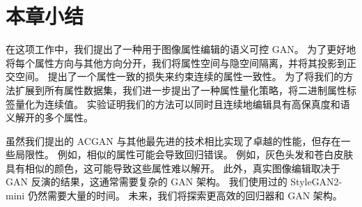 \section{本章小结}
在这项工作中，我们提出了一种用于图像属性编辑的语义可控 GAN。 为了更好地将每个属性方向与其他方向分开，我们将属性空间与隐空间隔离，并将其投影到正交空间。 提出了一个属性一致的损失来约束连续的属性一致性。 为了将我们的方法扩展到所有属性数据集，我们进一步提出了一种属性量化策略，将二进制属性标签量化为连续值。 实验证明我们的方法可以同时且连续地编辑具有高保真度和语义解开的多个属性。

虽然我们提出的 ACGAN 与其他最先进的技术相比实现了卓越的性能，但存在一些局限性。 例如，相似的属性可能会导致回归错误。 例如，灰色头发和苍白皮肤具有相似的颜色，这可能导致这些属性难以解开。 此外，真实图像编辑取决于 GAN 反演的结果，这通常需要复杂的 GAN 架构。 我们使用过的 StyleGAN2-mini 仍然需要大量的时间。 未来，我们将探索更高效的回归器和 GAN 架构。
